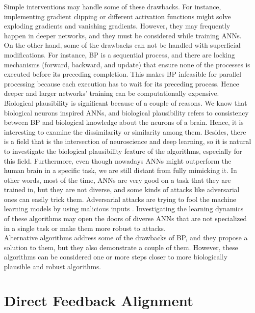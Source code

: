 \documentclass[a4paper, nobind]{templates/ociamthesis}
\begin{document}
\noindent Simple interventions may handle some of these drawbacks. For instance, implementing gradient clipping or different activation functions might solve exploding gradients and vanishing gradients. However, they may frequently happen in deeper networks, and they must be considered while training ANNs. On the other hand, some of the drawbacks can not be handled with superficial modifications. For instance, BP is a sequential process, and there are locking mechanisms (forward, backward, and update) that ensure none of the processes is executed before its preceding completion. This makes BP infeasible for parallel processing because each execution has to wait for its preceding process. Hence deeper and larger networks' training can be computationally expensive.\\
Biological plausibility is significant because of a couple of reasons. We know that biological neurons inspired ANNs, and biological plausibility refers to consistency between BP and biological knowledge about the neurons of a brain. Hence, it is interesting to examine the dissimilarity or similarity among them. Besides, there is a field that is the intersection of neuroscience and deep learning, so it is natural to investigate the biological plausibility feature of the algorithms, especially for this field. Furthermore, even though nowadays ANNs might outperform the human brain in a specific task, we are still distant from fully mimicking it. In other words, most of the time, ANNs are very good on a task that they are trained in, but they are not diverse, and some kinds of attacks like adversarial ones can easily trick them. Adversarial attacks are trying to fool the machine learning models by using malicious inputs \cite{DBLP:journals/corr/KurakinGB16a}. Investigating the learning dynamics of these algorithms may open the doors of diverse ANNs that are not specialized in a single task or make them more robust to attacks.\\
Alternative algorithms address some of the drawbacks of BP, and they propose a solution to them, but they also demonstrate a couple of them. However, these algorithms can be considered one or more steps closer to more biologically plausible and robust algorithms.

\hypertarget{direct-feedback-alignment}{%
\section{Direct Feedback Alignment}\label{direct-feedback-alignment}}
\end{document}
